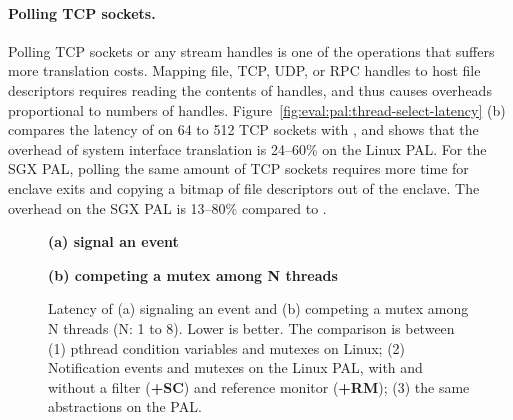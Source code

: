 \paragraph{Polling TCP sockets.}
Polling TCP sockets or any stream handles
is one of the operations that suffers more translation costs.
Mapping file, TCP, UDP, or RPC handles
to host file descriptors
requires reading the contents
of handles,
and thus causes overheads
proportional to
numbers of handles.
Figure~\ref{fig:eval:pal:thread-select-latency} (b)
compares the latency of
 on 64 to 512 TCP sockets
with ,
and shows that the overhead
of system interface translation is 24--60\% on the Linux PAL.
For the SGX PAL,
polling the same amount
of TCP sockets
requires more time for enclave exits and copying a bitmap of file descriptors
out of the enclave. 
The overhead on the SGX PAL is 13--80\%
compared to .





\begin{figure*}[t!]
\centering
\footnotesize
{}
\parbox{0.49\textwidth}{\centering\bf (a) signal an event}
\parbox{0.49\textwidth}{\centering\bf (b) competing a mutex among N threads}
\caption{Latency of (a) signaling an event and (b) competing a mutex among N threads (N: 1 to 8).
Lower is better.
The comparison is between (1) pthread condition variables and mutexes on Linux; (2) Notification events and mutexes on the Linux PAL, with and without a \seccomp{} filter ({\bf +SC}) and reference monitor ({\bf +RM}); (3) the same abstractions on the \sgx{} PAL.}
\label{fig:eval:pal:sched-latency}
\end{figure*}




